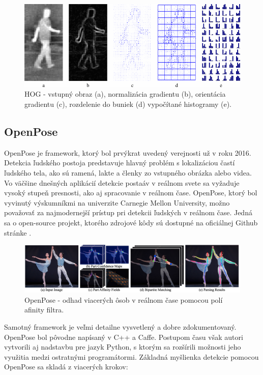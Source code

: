 \documentclass[slovak,master,dept460,male,cpp,cpdeclaration]{diploma}
\begin{document}
\begin{figure}[H]
	\centering
	\includegraphics[width=1\textwidth]{Figures/hog3.png}
	\caption{HOG - vstupný obraz (a), normalizácia gradientu (b), orientácia gradientu (c), rozdelenie do buniek (d) vypočítané histogramy (e). \cite{bertozzi2007pedestrian}}
	\label{fig:HOG2}
\end{figure}


\newpage
\subsection{OpenPose}
OpenPose\cite{cao2018openpose} je framework, ktorý bol prvýkrat uvedený verejnosti už v roku 2016. Detekcia ľudského postoja predstavuje hlavný problém s lokalizáciou častí ľudského tela, ako sú ramená, lakte a členky zo vstupného obrázka alebo videa. Vo väčšine dnešných aplikácií detekcie postaáv v reálnom svete sa vyžaduje vysoký stupeň presnosti, ako aj spracovanie v reálnom čase.
OpenPose, ktorý bol vyvinutý výskumníkmi na univerzite Carnegie Mellon University, možno považovať za najmodernejší prístup pri detekcii ľudských v reálnom čase. Jedná sa o open-source projekt, ktorého zdrojové kôdy sú dostupné na oficiálnej Github stránke \cite{githubOpenpose}.

\begin{figure}[H]
	\centering
	\includegraphics[width=1\textwidth]{Figures/openposePipeline.png}
	\caption{OpenPose - odhad viacerých ôsob v reálnom čase pomocou polí afinity filtra.\cite{cao2018openpose}}
	\label{fig:openposeOverall}
\end{figure}

 Samotný framework je veľmi detailne vysvetlený a dobre zdokumentovaný. OpenPose bol pôvodne napísaný v C++ a Caffe\cite{jia2014caffe}. Postupom času však  autori vytvorili aj  nadstavbu pre jazyk Python, s ktorým sa rozšírili možnosti jeho využitia medzi ostratnými programátormi. Základná myšlienka detekcie pomocou OpenPose sa skladá z viacerých krokov:
\end{document}
